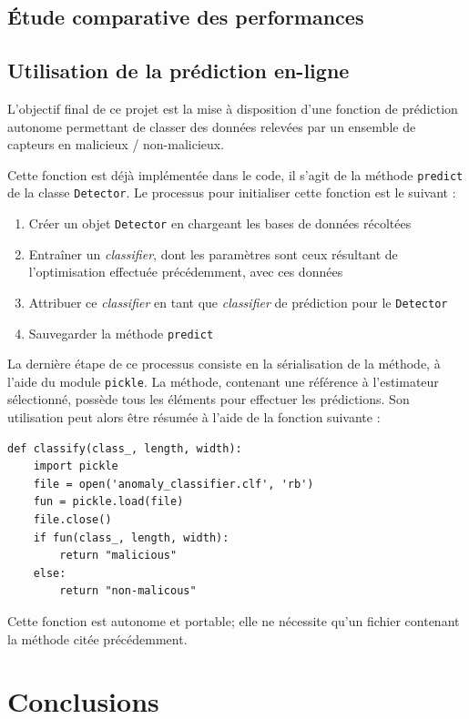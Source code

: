 \documentclass[a4paper]{report}
\begin{document}
\section{Étude comparative des performances}

\section{Utilisation de la prédiction en-ligne}

L'objectif final de ce projet est la mise à disposition d'une fonction de prédiction autonome permettant de classer des données relevées par un ensemble de capteurs en malicieux / non-malicieux.

Cette fonction est déjà implémentée dans le code, il s'agit de la méthode \texttt{predict} de la classe \texttt{Detector}. Le processus pour initialiser cette fonction est le suivant :
\begin{enumerate}
\item Créer un objet \texttt{Detector} en chargeant les bases de données récoltées
\item Entraîner un \emph{classifier}, dont les paramètres sont ceux résultant de l'optimisation effectuée précédemment, avec ces données
\item Attribuer ce \emph{classifier} en tant que \emph{classifier} de prédiction pour le \texttt{Detector}
\item Sauvegarder la méthode \texttt{predict}
\end{enumerate}
La dernière étape de ce processus consiste en la sérialisation de la méthode, à l'aide du module \texttt{pickle}. La méthode, contenant une référence à l'estimateur sélectionné, possède tous les éléments pour effectuer les prédictions. Son utilisation peut alors être résumée à l'aide de la fonction suivante :
\begin{verbatim}
def classify(class_, length, width):
    import pickle
    file = open('anomaly_classifier.clf', 'rb')
    fun = pickle.load(file)
    file.close()
    if fun(class_, length, width):
        return "malicious"
    else:
        return "non-malicous"
\end{verbatim}
Cette fonction est autonome et portable; elle ne nécessite qu'un fichier contenant la méthode citée précédemment.

\chapter{Conclusions}
\end{document}
